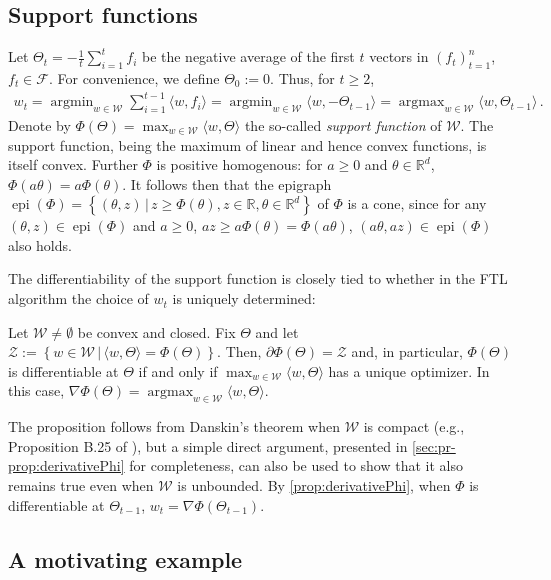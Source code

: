 \documentclass[english]{article}
\newcommand{\todoa}[2][]{\todo[color=Purple!20,size=\tiny,#1]{A: #2}}
\newcommand{\cZ}{\mathcal{Z}}
\newcommand{\cW}{\mathcal{W}}
\newcommand{\cF}{\mathcal{F}}
\newcommand{\R}{\mathbb{R}}
\newcommand{\inpro}[2]{\langle #1, #2\rangle}
\newcommand{\ip}[1]{\langle#1\rangle}
\newcommand{\set}[2]{\left\{#1 \,\vert\, #2 \right\}}
\DeclareMathOperator*{\argmin}{argmin}
\DeclareMathOperator*{\argmax}{argmax}
\DeclareMathOperator{\epi}{epi}
\begin{document}
\subsection{Support functions}
Let $\Theta_t = -\frac1t \sum_{i=1}^t f_i$ be the negative average of the first $t$ vectors
in $(f_t)_{t=1}^n$, $f_t\in \cF$.
For convenience, we define $\Theta_0 := 0$.
Thus, for $t\ge 2$,
\begin{align*}
w_t =  \argmin_{w\in\cW} \sum_{i=1}^{t-1} \ip{ w, f_i } = \argmin_{w\in\cW} \ip{ w, -\Theta_{t-1} }
= \argmax_{w\in \cW} \ip{w,\Theta_{t-1}}\,.
\end{align*}
Denote by $\Phi(\Theta) = \max_{w\in\cW} \langle w, \Theta\rangle$ the so-called \emph{support function} of $\cW$. 
The support function, being the maximum of linear and hence convex functions, is itself convex.
Further $\Phi$ is positive homogenous: for $a\ge 0$ and $\theta\in \R^d$, $\Phi(a \theta) = a\Phi(\theta)$.
It follows then that the epigraph $\epi(\Phi) = \set{ (\theta,z)}{ z\ge \Phi(\theta), z\in \R, \theta\in \R^d }$ of $\Phi$ is a cone,
since for any $(\theta,z)\in \epi(\Phi)$ and $a\ge 0$, 
$az \ge a \Phi(\theta) = \Phi(a\theta)$, $(a\theta,az)\in \epi(\Phi)$ also holds.


The differentiability of the support function is closely tied to whether in the FTL algorithm the choice of $w_t$ is
uniquely determined:
\begin{proposition} 
\label{prop:derivativePhi}
Let $\cW\ne \emptyset$ be convex and closed.
Fix $\Theta$ and let $\cZ:= \set{w\in \cW}{\inpro{w}{\Theta} =  \Phi(\Theta) }$.
Then, $\partial \Phi(\Theta) = \cZ$ and, in particular,
$\Phi(\Theta)$ is differentiable at $\Theta$ if and only if 
$\max_{w\in\cW} \inpro{w}{\Theta}$ has a unique optimizer.
In this case, $\nabla \Phi(\Theta) = \argmax_{w\in \cW} \ip{w,\Theta}$.
\end{proposition}
The proposition follows from Danskin's theorem when $\cW$ is compact
(e.g., Proposition B.25 of \citealt{bertsekas99nonlinear}), 
but a simple
direct argument, presented in \cref{sec:pr-prop:derivativePhi} for completeness, can also be used to show that it also remains true even when $\cW$ is unbounded.
By \cref{prop:derivativePhi},
when $\Phi$ is differentiable at $\Theta_{t-1}$,
$w_t = \nabla \Phi(\Theta_{t-1})$.

\subsection{A motivating example}
\label{sec:FTLstoch}
\end{document}
